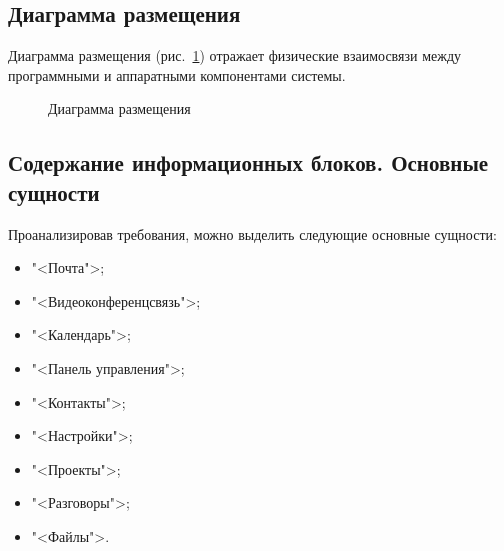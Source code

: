 \subsection{Диаграмма размещения}

Диаграмма размещения (рис.~\ref{place:image}) отражает физические взаимосвязи между программными и аппаратными компонентами системы.

\vspace{-8mm} %
\begin{figure}[H]
\caption{Диаграмма размещения}
\label{place:image}
\end{figure}

\subsection{Содержание информационных блоков. Основные сущности}

Проанализировав требования, можно выделить следующие основные сущности:
\begin{itemize}
  \item "<Почта">;
  \item "<Видеоконференцсвязь">;
  \item "<Календарь">;
  \item "<Панель управления">;
  \item "<Контакты">;
  \item "<Настройки">;
  \item "<Проекты">;
  \item "<Разговоры">;
  \item "<Файлы">.
\end{itemize}

